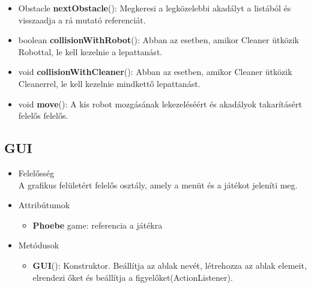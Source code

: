 \begin{itemize}
\begin{itemize}
	    \item Obstacle \textbf{nextObstacle}(): Megkeresi a legközelebbi akadályt a listából és visszaadja a rá mutató referenciát.
		\item boolean \textbf{collisionWithRobot}(): Abban az esetben, amikor Cleaner ütközik Robottal, le kell kezelnie a lepattanást.
		\item void \textbf{collisionWithCleaner}(): Abban az esetben, amikor Cleaner ütközik Cleanerrel, le kell kezelnie mindkettő lepattanást.
		\item void \textbf{move}(): A kis robot mozgásának lekezeléséért és akadályok takarításért felelős felelős.
	\end{itemize}
\end{itemize}



\subsection{GUI}
\begin{itemize}
\item Felelősség\\
A grafikus felületért felelős osztály, amely a menüt és a játékot jeleníti meg.
\item Attribútumok
	\begin{itemize}
		\item \textbf{Phoebe} game: referencia a játékra
	\end{itemize}
\item Metódusok
	\begin{itemize}
		\item\textbf{GUI}(): Konstruktor. Beállítja az ablak nevét, létrehozza az ablak elemeit, elrendezi őket és beállítja a figyelőket(ActionListener).
	\end{itemize}
\end{itemize}

